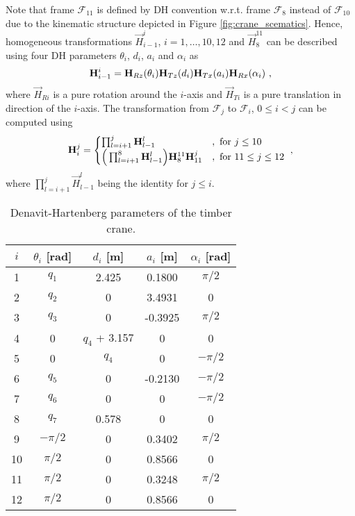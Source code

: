     Note that frame $\mathcal{F}_{11}$ is defined by DH convention w.r.t. frame $\mathcal{F}_{8}$ instead of $\mathcal{F}_{10}$ due to the kinematic structure depicted in Figure \ref{fig:crane_scematics}.
    Hence, homogeneous transformations $\vec{H}_{i-1}^i$, $i=1,\dots,10,12$ and $\vec{H}_{8}^{11}$ can be described using four DH parameters $\theta_i$, $d_i$, $a_i$ and $\alpha_i$ as
    \begin{align}
    	\mathbf{H}_{i-1}^i = \mathbf{H}_{Rz}(\theta_i)\mathbf{H}_{Tz}(d_i)\mathbf{H}_{Tx}(a_i)\mathbf{H}_{Rx}(\alpha_i)\text{~,}
    \end{align}
    where $\vec{H}_{Ri}$ is a pure rotation around the $i$-axis and $\vec{H}_{Ti}$ is a pure translation in direction of the $i$-axis. 
    The transformation from $\mathcal{F}_j$ to $\mathcal{F}_i$, $0\leq i < j$ can be computed using
    \begin{align}
    	\mathbf{H}_i^j=\begin{cases}
    		\prod_{l=i+1}^j\mathbf{H}_{l-1}^l&,\text{ for }j\leq 10\\
    		\Big(\prod_{l=i+1}^8\mathbf{H}_{l-1}^l\Big)\mathbf{H}_{8}^{11}\mathbf{H}_{11}^j&,\text{ for }11\leq j\leq 12
    	\end{cases}\text{~,}
    \end{align}
    where $\prod_{l=i+1}^j\vec{H}_{l-1}^l$ being the identity for $j\leq i$.
    \begin{table}
        \caption{Denavit-Hartenberg parameters of the timber crane.}\label{tab:DHParams}
    	\centering
    	\begin{tabular}{c|cccc}
                \hline
    		$i$ & $\theta_i$ [rad] & $d_i$ [m] & $a_i$ [m] & $\alpha_i$ [rad]\\
    		\hline
    		1   &            $q_1$ & 2.425     & 0.1800      &$\pi/2$\\
    		2   &            $q_2$ & 0         & 3.4931    &0\\
    		3   &            $q_3$ & 0         & -0.3925   &$\pi/2$\\
    		4   &                0 & $q_4$ + 3.157     & 0         &0\\
    		5   &                0 & $q_4$     & 0         &$-\pi/2$\\
    		6   &            $q_5$ & 0         & -0.2130   &$-\pi/2$\\
    		7   &            $q_6$ & 0         & 0         &$-\pi/2$\\
    		8   &            $q_7$ & 0.578     & 0         &0\\
    		9   & $-\pi/2$ & 0         & 0.3402    &$\pi/2$\\
    		10  &           $\pi/2$ & 0         & 0.8566    &0\\
    		11  &  $\pi/2$ & 0         & 0.3248    &$\pi/2$\\
    		12  &           $\pi/2$ & 0         & 0.8566    &0\\
                 \hline
    	\end{tabular}
    \end{table}
